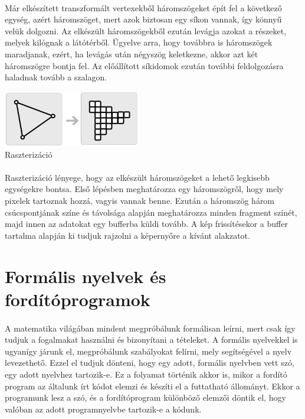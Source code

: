 \documentclass[12pt]{report}
\begin{document}
\paragraph{}
Már elkészített transzformált vertexekből háromszögeket épít fel a következő egység, azért háromszöget, mert azok biztosan egy síkon vannak, így könnyű velük dolgozni. Az elkészült háromszögekből ezután levágja azokat a részeket, melyek kilógnak a látótérből. Ügyelve arra, hogy továbbra is háromszögek maradjanak, ezért, ha levágás után négyszög keletkezne, akkor azt két háromszögre bontja fel. Az előállított síkidomok ezután további feldolgozásra haladnak tovább a szalagon.
\begin{center}
\includegraphics[width=6cm]{pics/rasterization}\\
{\footnotesize Raszterizáció}
\end{center}
\paragraph{}
Raszterizáció lényege, hogy az elkészült háromszögeket a lehető legkisebb egységekre bontsa. Első lépésben meghatározza egy háromszögről, hogy mely pixelek tartoznak hozzá, vagyis vannak benne. Ezután a háromszög három csúcspontjának színe és távolsága alapján meghatározza minden fragment színét, majd innen az adatokat egy bufferba küldi tovább. A kép frissítésekor a buffer tartalma alapján ki tudjuk rajzolni a képernyőre a kívánt alakzatot.

\section{Formális nyelvek és fordítóprogramok}
\paragraph{}
A matematika világában mindent megpróbálunk formálisan leírni, mert csak így tudjuk a fogalmakat használni és bizonyítani a tételeket. A formális nyelvekkel is ugyanígy járunk el, megpróbálunk szabályokat felírni, mely segítségével a nyelv levezethető. Ezzel el tudjuk dönteni, hogy egy adott, formális nyelvben vett szó, egy adott nyelvhez tartozik-e. Ez a folyamat történik akkor is, mikor a fordító program az általunk írt kódot elemzi és készíti el a futtatható állományt. Ekkor a programunk lesz a szó, és a fordítóprogram különböző elemzői döntik el, hogy valóban az adott programnyelvbe tartozik-e a kódunk.
\end{document}
